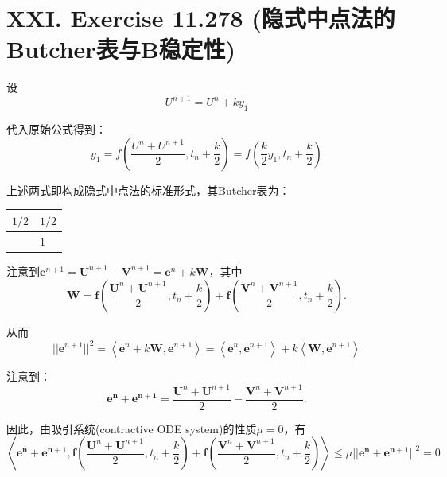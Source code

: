 \documentclass[twoside,a4paper]{article}
\begin{document}
\section*{XXI. Exercise 11.278 (隐式中点法的Butcher表与B稳定性)}

\;\;\;\;\;\;设
\begin{equation*}
    U^{n+1}=U^n+ky_1
\end{equation*}

代入原始公式得到：
\begin{equation*}
    y_1=f\left(\frac{U^n+U^{n+1}}{2},t_n+\frac{k}{2}\right)=f\left(\frac{k}{2}y_1,t_n+\frac{k}{2}\right)
\end{equation*}

上述两式即构成隐式中点法的标准形式，其Butcher表为：
\begin{table}[H]
    \centering
    \begin{tabular}{l|l}
        $1/2$ & $1/2$\\ \hline
        & $1$
    \end{tabular}
\end{table}

注意到$\mathbf{e}^{n+1}=\mathbf{U}^{n+1}-\mathbf{V}^{n+1}=\mathbf{e}^n+k\mathbf{W}$，其中
\begin{equation*}
    \mathbf{W}= \mathbf{f}\left(\frac{\mathbf{U}^n+\mathbf{U}^{n+1}}{2},t_n+\frac{k}{2}\right)
    +\mathbf{f}\left(\frac{\mathbf{V}^n+\mathbf{V}^{n+1}}{2},t_n+\frac{k}{2}\right) .
\end{equation*}

从而
\begin{equation}
    ||\mathbf{e}^{n+1}||^2 = \left\langle \mathbf{e}^n+k\mathbf{W}, \mathbf{e}^{n+1} \right\rangle= \left\langle \mathbf{e}^n, \mathbf{e}^{n+1} \right\rangle + k \left\langle \mathbf{W}, \mathbf{e}^{n+1} \right\rangle
\end{equation}

注意到：
\begin{equation*}
    \mathbf{e^n}+\mathbf{e^{n+1}}=\frac{\mathbf{U}^n+\mathbf{U}^{n+1}}{2} - \frac{\mathbf{V}^n+\mathbf{V}^{n+1}}{2}.
\end{equation*}

因此，由吸引系统(contractive ODE system)的性质$\mu=0$，有
\begin{equation*}
    \left\langle \mathbf{e^n}+\mathbf{e^{n+1}},  \mathbf{f}\left(\frac{\mathbf{U}^n+\mathbf{U}^{n+1}}{2},t_n+\frac{k}{2}\right)
    +\mathbf{f}\left(\frac{\mathbf{V}^n+\mathbf{V}^{n+1}}{2},t_n+\frac{k}{2}\right) \right\rangle\leq \mu||\mathbf{e^n}+\mathbf{e^{n+1}}||^2=0
\end{equation*}
\end{document}
